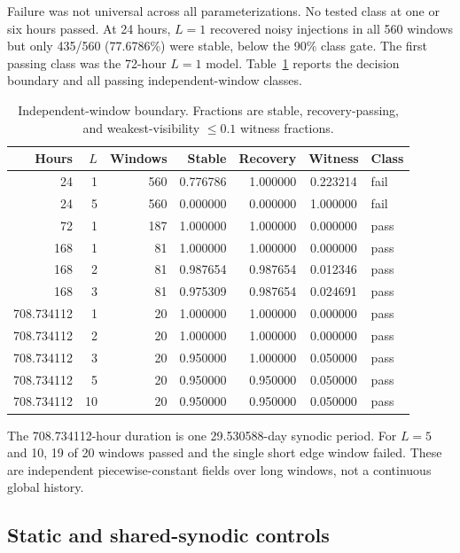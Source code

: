 \documentclass[11pt]{article}
\begin{document}
Failure was not universal across all parameterizations.  No tested class at
one or six hours passed.  At 24 hours, $L=1$ recovered noisy injections in all
560 windows but only 435/560 (77.6786\%) were stable, below the 90\% class gate.
The first passing class was the 72-hour $L=1$ model.  Table~\ref{tab:coarse}
reports the decision boundary and all passing independent-window classes.

\begin{table}[ht]
\centering
\caption{Independent-window boundary.  Fractions are stable, recovery-passing,
and weakest-visibility $\leq0.1$ witness fractions.}
\label{tab:coarse}
\begin{tabular}{rrrrrcl}
\toprule
Hours & $L$ & Windows & Stable & Recovery & Witness & Class \\
\midrule
24 & 1 & 560 & 0.776786 & 1.000000 & 0.223214 & fail \\
24 & 5 & 560 & 0.000000 & 0.000000 & 1.000000 & fail \\
72 & 1 & 187 & 1.000000 & 1.000000 & 0.000000 & pass \\
168 & 1 & 81 & 1.000000 & 1.000000 & 0.000000 & pass \\
168 & 2 & 81 & 0.987654 & 0.987654 & 0.012346 & pass \\
168 & 3 & 81 & 0.975309 & 0.987654 & 0.024691 & pass \\
708.734112 & 1 & 20 & 1.000000 & 1.000000 & 0.000000 & pass \\
708.734112 & 2 & 20 & 1.000000 & 1.000000 & 0.000000 & pass \\
708.734112 & 3 & 20 & 0.950000 & 1.000000 & 0.050000 & pass \\
708.734112 & 5 & 20 & 0.950000 & 0.950000 & 0.050000 & pass \\
708.734112 & 10 & 20 & 0.950000 & 0.950000 & 0.050000 & pass \\
\bottomrule
\end{tabular}
\end{table}

The 708.734112-hour duration is one 29.530588-day synodic period.  For $L=5$
and 10, 19 of 20 windows passed and the single short edge window failed.  These
are independent piecewise-constant fields over long windows, not a continuous
global history.

\subsection{Static and shared-synodic controls}
\end{document}
